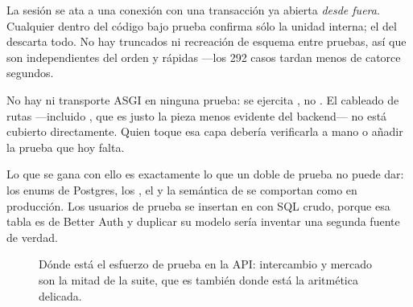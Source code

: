 La sesión se ata a una conexión con una transacción ya abierta \emph{desde
fuera}. Cualquier  dentro del código bajo prueba
confirma sólo la unidad interna; el  del 
descarta todo. No hay truncados ni recreación de esquema entre pruebas, así que
son independientes del orden y rápidas —los 292 casos tardan menos de catorce
segundos.

\begin{pkwarn}
No hay  ni transporte ASGI en ninguna prueba: se ejercita
, no . El cableado de rutas —incluido
, que es justo la pieza menos evidente del
backend— no está cubierto directamente. Quien toque esa capa debería verificarla
a mano o añadir la prueba que hoy falta.
\end{pkwarn}

Lo que se gana con ello es exactamente lo que un doble de prueba no puede dar:
los enums de Postgres, los , el
 y la semántica de  se
comportan como en producción. Los usuarios de prueba se insertan en
 con SQL crudo, porque esa tabla es de Better Auth y
duplicar su modelo sería inventar una segunda fuente de verdad.

\begin{figure}[htbp]
\centering
{}
\caption{Dónde está el esfuerzo de prueba en la API: intercambio y mercado son
  la mitad de la suite, que es también donde está la aritmética delicada.}
\label{fig:tests-api}
\end{figure}

